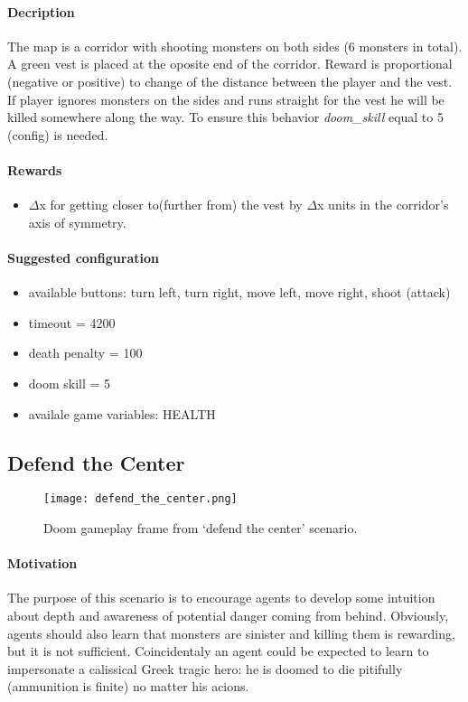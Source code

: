 		\paragraph{Decription}
			The map is a corridor with shooting monsters on both sides (6 monsters in total). A green vest is placed at the oposite end of the corridor. Reward is proportional (negative or positive) to change of the distance between the player and the vest. If player ignores monsters on the sides and runs straight for the vest he will be killed somewhere along the way. To ensure this behavior \textit{doom\_skill} equal to 5 (config) is needed.

		\paragraph{Rewards}
			\begin{itemize}
				\item $\Delta$x for getting closer to(further from) the vest by $\Delta$x units in the corridor's axis of symmetry.
			\end{itemize}
			
		\paragraph{Suggested configuration}
			\begin{itemize}
				\item available buttons: turn left, turn right, move left, move right, shoot (attack)
				\item timeout = 4200
				\item death penalty = 100
				\item doom skill = 5
				\item availale game variables: HEALTH
			\end{itemize}
	\newpage

	\subsection{Defend the Center}\label{subsec:defend_the_center}
		\begin{figure}
			\centering
			\texttt{[image: defend\_the\_center.png]}
			\caption{Doom gameplay frame from `defend the center' scenario.}\label{fig:defend_the_center}
		\end{figure}
		\paragraph{Motivation} 
			The purpose of this scenario is to encourage agents to develop some intuition about depth and awareness of potential danger coming from behind. Obviously, agents should also learn that monsters are sinister and killing them is rewarding, but it is not sufficient. Coincidentaly an agent could be expected to learn to impersonate a calissical Greek tragic hero: he is doomed to die pitifully (ammunition is finite) no matter his acions.

